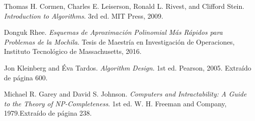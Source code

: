 \documentclass{report}
\begin{document}
	
	
	
	
	
	\begin{thebibliography}{9}
		
		Thomas H. Cormen, Charles E. Leiserson, Ronald L. Rivest, and Clifford Stein.
		\textit{Introduction to Algorithms}.
		3rd ed. MIT Press, 2009.
		
		Donguk Rhee.
		\textit{Esquemas de Aproximación Polinomial Más Rápidos para Problemas de la Mochila}.
		Tesis de Maestría en Investigación de Operaciones, Instituto Tecnológico de Massachusetts, 2016.
		
		Jon Kleinberg and Éva Tardos.
		\textit{Algorithm Design}.
		1st ed. Pearson, 2005. Extraído de página 600.

		Michael R. Garey and David S. Johnson.
		\textit{Computers and Intractability: A Guide to the Theory of NP-Completeness}.
		1st ed. W. H. Freeman and Company, 1979.Extraído de página 238.
		
		
	\end{thebibliography}
\end{document}
